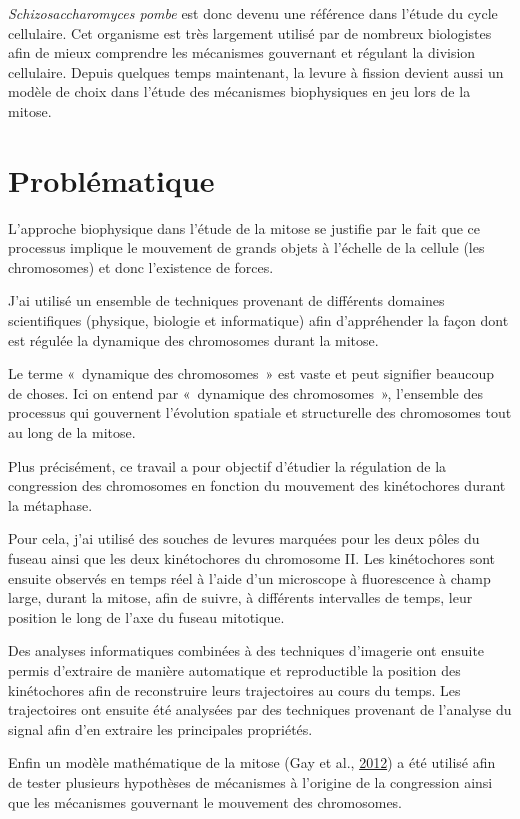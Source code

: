\documentclass[12pt,a4paper,twoside,openright]{book}
\begin{document}
\emph{Schizosaccharomyces pombe} est donc devenu une référence dans
l'étude du cycle cellulaire. Cet organisme est très largement utilisé
par de nombreux biologistes afin de mieux comprendre les mécanismes
gouvernant et régulant la division cellulaire. Depuis quelques temps
maintenant, la levure à fission devient aussi un modèle de choix dans
l'étude des mécanismes biophysiques en jeu lors de la mitose.

\section{Problématique}\label{probluxe9matique}

L'approche biophysique dans l'étude de la mitose se justifie par le fait
que ce processus implique le mouvement de grands objets à l'échelle de
la cellule (les chromosomes) et donc l'existence de forces.

J'ai utilisé un ensemble de techniques provenant de différents domaines
scientifiques (physique, biologie et informatique) afin d'appréhender la
façon dont est régulée la dynamique des chromosomes durant la mitose.

Le terme «~dynamique des chromosomes~» est vaste et peut signifier
beaucoup de choses. Ici on entend par «~dynamique des chromosomes~»,
l'ensemble des processus qui gouvernent l'évolution spatiale et
structurelle des chromosomes tout au long de la mitose.

Plus précisément, ce travail a pour objectif d'étudier la régulation de
la congression des chromosomes en fonction du mouvement des kinétochores
durant la métaphase.

Pour cela, j'ai utilisé des souches de levures marquées pour les deux
pôles du fuseau ainsi que les deux kinétochores du chromosome II. Les
kinétochores sont ensuite observés en temps réel à l'aide d'un
microscope à fluorescence à champ large, durant la mitose, afin de
suivre, à différents intervalles de temps, leur position le long de
l'axe du fuseau mitotique.

Des analyses informatiques combinées à des techniques d'imagerie ont
ensuite permis d'extraire de manière automatique et reproductible la
position des kinétochores afin de reconstruire leurs trajectoires au
cours du temps. Les trajectoires ont ensuite été analysées par des
techniques provenant de l'analyse du signal afin d'en extraire les
principales propriétés.

Enfin un modèle mathématique de la mitose (Gay et al.,
\protect\hyperlink{ref-Gay2012a}{2012}) a été utilisé afin de tester
plusieurs hypothèses de mécanismes à l'origine de la congression ainsi
que les mécanismes gouvernant le mouvement des chromosomes.
\end{document}
